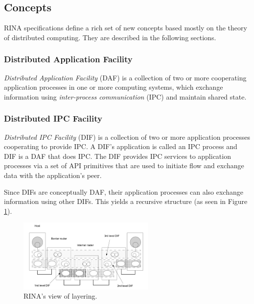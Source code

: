         \subsection{Concepts}

            RINA specifications define a rich set of new concepts based mostly on the theory of distributed computing. They are described in the following sections.

            \subsubsection{Distributed Application Facility}

                \emph{Distributed Application Facility} (DAF) is a collection of two or more cooperating application processes in one or more computing systems, which exchange information using \emph{inter-process communication} (IPC) and maintain shared state.

            \subsubsection{Distributed IPC Facility}

                \emph{Distributed IPC Facility} (DIF) is a collection of two or more application processes cooperating to provide IPC. A DIF's application is called an IPC process and DIF is a DAF that does IPC. The DIF provides IPC services to application processes via a set of API primitives that are used to initiate flow and exchange data with the application's peer.

                Since DIFs are conceptually DAF, their application processes can also exchange information using other DIFs. This yields a recursive structure (as seen in Figure \ref{fig:rina_layers}).

                \begin{figure}[H]
                    \begin{center}
                        \includegraphics[width=0.6\textwidth]{fig/archs_rina-net.png}
                      \caption{RINA's view of layering.}
                      \label{fig:rina_layers}
                    \end{center}
                \end{figure}

